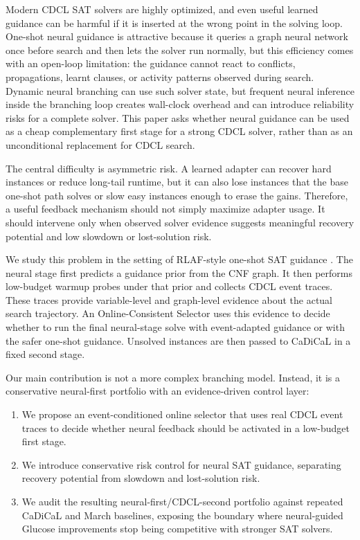 \documentclass[11pt]{article}
\begin{document}
Modern CDCL SAT solvers are highly optimized, and even useful learned guidance can be harmful if it is inserted at the wrong point in the solving loop. One-shot neural guidance is attractive because it queries a graph neural network once before search and then lets the solver run normally, but this efficiency comes with an open-loop limitation: the guidance cannot react to conflicts, propagations, learnt clauses, or activity patterns observed during search. Dynamic neural branching can use such solver state, but frequent neural inference inside the branching loop creates wall-clock overhead and can introduce reliability risks for a complete solver. This paper asks whether neural guidance can be used as a cheap complementary first stage for a strong CDCL solver, rather than as an unconditional replacement for CDCL search.

The central difficulty is asymmetric risk. A learned adapter can recover hard instances or reduce long-tail runtime, but it can also lose instances that the base one-shot path solves or slow easy instances enough to erase the gains. Therefore, a useful feedback mechanism should not simply maximize adapter usage. It should intervene only when observed solver evidence suggests meaningful recovery potential and low slowdown or lost-solution risk.

We study this problem in the setting of RLAF-style one-shot SAT guidance \cite{rlaf}. The neural stage first predicts a guidance prior from the CNF graph. It then performs low-budget warmup probes under that prior and collects CDCL event traces. These traces provide variable-level and graph-level evidence about the actual search trajectory. An Online-Consistent Selector uses this evidence to decide whether to run the final neural-stage solve with event-adapted guidance or with the safer one-shot guidance. Unsolved instances are then passed to CaDiCaL in a fixed second stage.

Our main contribution is not a more complex branching model. Instead, it is a conservative neural-first portfolio with an evidence-driven control layer:
\begin{enumerate}
    \item We propose an event-conditioned online selector that uses real CDCL event traces to decide whether neural feedback should be activated in a low-budget first stage.
    \item We introduce conservative risk control for neural SAT guidance, separating recovery potential from slowdown and lost-solution risk.
    \item We audit the resulting neural-first/CDCL-second portfolio against repeated CaDiCaL and March baselines, exposing the boundary where neural-guided Glucose improvements stop being competitive with stronger SAT solvers.
\end{enumerate}
\end{document}
